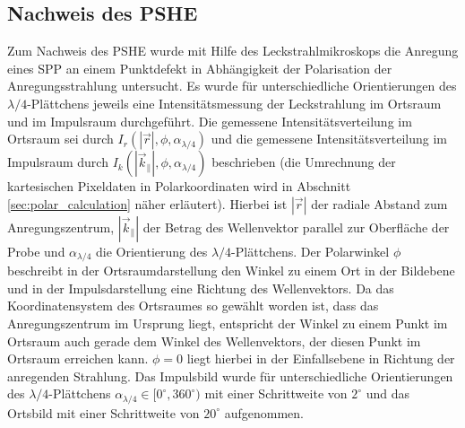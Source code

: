 \documentclass[titlepage,  ngerman]{article}
\begin{document}
	\subsection{Nachweis des PSHE}
	Zum Nachweis des PSHE wurde mit Hilfe des Leckstrahlmikroskops die Anregung eines SPP an einem Punktdefekt in Abhängigkeit der Polarisation der Anregungsstrahlung untersucht. Es wurde für unterschiedliche Orientierungen des $\lambda /4$-Plättchens jeweils eine Intensitätsmessung der Leckstrahlung im Ortsraum und im Impulsraum durchgeführt. Die gemessene Intensitätsverteilung im Ortsraum sei durch $I_r(|\vec{r}|, \phi, \alpha_{\lambda /4})$ und die gemessene Intensitätsverteilung im Impulsraum durch $I_k(|\vec{k}_\parallel|, \phi, \alpha_{\lambda /4})$ beschrieben (die Umrechnung der kartesischen Pixeldaten in Polarkoordinaten wird in Abschnitt \ref{sec:polar_calculation} näher erläutert). Hierbei ist $|\vec{r}|$ der radiale Abstand zum Anregungszentrum, $|\vec{k}_\parallel|$ der Betrag des Wellenvektor parallel zur Oberfläche der Probe und $\alpha_{\lambda/4}$ die Orientierung des $\lambda/4$-Plättchens. Der Polarwinkel $\phi$ beschreibt in der Ortsraumdarstellung den Winkel zu einem Ort in der Bildebene und in der Impulsdarstellung eine Richtung des Wellenvektors. Da das Koordinatensystem des Ortsraumes so gewählt worden ist, dass das Anregungszentrum im Ursprung liegt, entspricht der Winkel zu einem Punkt im Ortsraum auch gerade dem Winkel des Wellenvektors, der diesen Punkt im Ortsraum erreichen kann. $\phi = 0$ liegt hierbei in der Einfallsebene in Richtung der anregenden Strahlung. Das Impulsbild wurde für unterschiedliche Orientierungen des $\lambda/4$-Plättchens  $\alpha_{\lambda/4} \in [0^\circ,360^\circ)$ mit einer Schrittweite von $2^\circ$ und das Ortsbild mit einer Schrittweite von $20^\circ$ aufgenommen.
	
\end{document}
